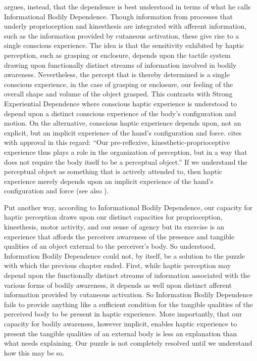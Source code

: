\citet[chapter 4.8]{Fulkerson:2014ek} argues, instead, that the dependence is best understood in terms of what he calls Informational Bodily Dependence. Though information from processes that underly proprioception and kinesthesis are integrated with afferent information, such as the information provided by cutaneous activation, these give rise to a single conscious experience. The idea is that the sensitivity exhibited by haptic perception, such as grasping or enclosure, depends upon the tactile system drawing upon functionally distinct streams of information involved in bodily awareness. Nevertheless, the percept that is thereby determined is a single conscious experience, in the case of grasping or enclosure, our feeling of the overall shape and volume of the object grasped. This contrasts with Strong Experiential Dependence where conscious haptic experience is understood to depend upon a distinct conscious experience of the body's configuration and motion. On the alternative, conscious haptic experience depends upon, not an explicit, but an implicit experience of the hand's configuration and force. \citet[91]{Fulkerson:2014ek} cites with approval \citet[137]{Gallagher:2005ag} in this regard: ``Our pre-reflexive, kinesthetic-proprioceptive experience thus plays a role in the organization of perception, but in a way that does not require the body itself to be a perceptual object.'' If we understand the perceptual object as something that is actively attended to, then haptic experience merely depends upon an implicit experience of the hand's configuration and force (see also \citealt{Bower:2013aa}).

Put another way, according to Informational Bodily Dependence, our capacity for haptic perception draws upon our distinct capacities for proprioception, kinesthesis, motor activity, and our sense of agency but its exercise is an experience that affords the perceiver awareness of the presence and tangible qualities of an object external to the perceiver's body. So understood, Information Bodily Dependence could not, by itself, be a solution to the puzzle with which the previous chapter ended. First, while haptic perception may depend upon the functionally distinct streams of information associated with the various forms of bodily awareness, it depends as well upon distinct afferent information provided by cutaneous activation. So Information Bodily Dependence fails to provide anything like a sufficient condition for the tangible qualities of the perceived body to be present in haptic experience. More importantly, that our capacity for bodily awareness, however implicit, enables haptic experience to present the tangible qualities of an external body is less an explanation than what needs explaining. Our puzzle is not completely resolved until we understand how this may be so.

